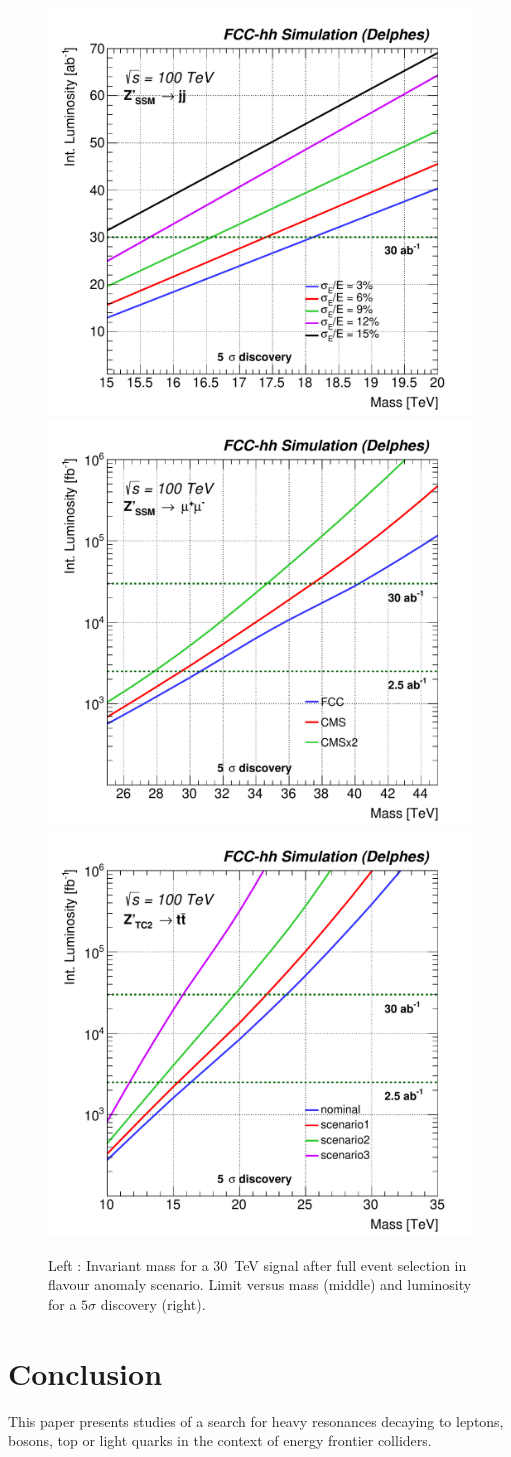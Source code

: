 \begin{figure}[!htb]
  \centering
    \includegraphics[width=0.32\columnwidth]{Fig/DiscoveryPotential_Zp_jj_comb_smeared_rootStyle-eps-converted-to.pdf}
  \includegraphics[width=0.32\columnwidth]{Fig/DiscoveryPotential_ll_smearhl_rootStyle-eps-converted-to.pdf}
  \includegraphics[width=0.32\columnwidth]{Fig/DiscoveryPotential_tt_TC2_tagger_TRFbtag_degrade_rootStyle-eps-converted-to.pdf}
  \caption{Left : Invariant mass for a 30~TeV signal after full event selection in flavour anomaly scenario. Limit versus mass (middle) and luminosity for a $5\sigma$ discovery (right). }
  \label{figure:detperf}
\end{figure}



\section{Conclusion}
\label{sec:conc}

This paper presents studies of a search for heavy resonances decaying to leptons, bosons, top or light quarks in the context of energy frontier colliders. 

\appendix
